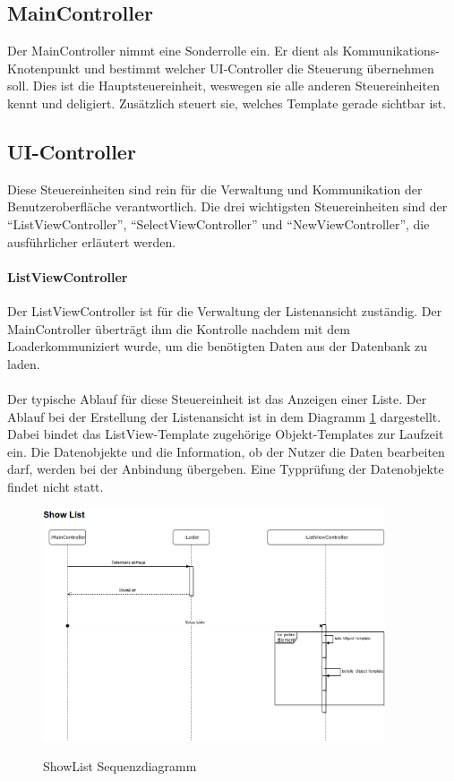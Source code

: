 \subsection{MainController}
Der MainController nimmt eine Sonderrolle ein. Er dient als Kommunikations-Knotenpunkt und bestimmt welcher UI-Controller die Steuerung 
übernehmen soll. Dies ist die Hauptsteuereinheit, weswegen sie alle anderen Steuereinheiten kennt und deligiert. Zusätzlich steuert sie,
welches Template gerade sichtbar ist.

\subsection{UI-Controller}

Diese Steuereinheiten sind rein für die Verwaltung und Kommunikation der Benutzeroberfläche verantwortlich.
Die drei wichtigsten Steuereinheiten sind der \enquote{ListViewController}, \enquote{SelectViewController} und \enquote{NewViewController},
die ausführlicher erläutert werden.

\paragraph{ListViewController}

Der ListViewController ist für die Verwaltung der Listenansicht zuständig. Der MainController überträgt ihm die Kontrolle
nachdem mit dem Loaderkommuniziert wurde, um die benötigten Daten aus der Datenbank zu laden.\\
\\
Der typische Ablauf für diese Steuereinheit ist das Anzeigen einer Liste. 
Der Ablauf bei der Erstellung der Listenansicht ist in dem Diagramm \ref{pic:showListSeq_diag} dargestellt. Dabei bindet 
das ListView-Template zugehörige Objekt-Templates zur Laufzeit ein. Die Datenobjekte und die Information, ob der Nutzer
die Daten bearbeiten darf, werden bei der Anbindung übergeben. Eine Typprüfung der Datenobjekte findet nicht statt.

\begin{figure}[htb!]
	\caption{ShowList Sequenzdiagramm}
	\includegraphics[width=0.9\textwidth]{content/pictures/ShowListSeq}
	\label{pic:showListSeq_diag}
\end{figure}

